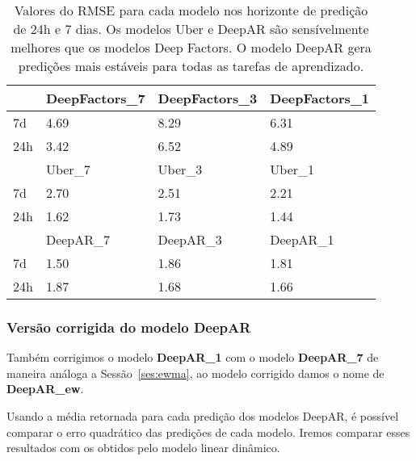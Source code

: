 \begin{center}
\begin{table}[]
  \centering
  \begin{tabular}{l|l|l|l|}
    \cline{2-4}
    & DeepFactors\_7 & DeepFactors\_3 & DeepFactors\_1 \\ \hline
    \multicolumn{1}{|l|}{7d}  & 4.69           & 8.29           & 6.31           \\ \hline
    \multicolumn{1}{|l|}{24h} & 3.42           & 6.52           & 4.89           \\ \hline
    & Uber\_7        & Uber\_3        & Uber\_1        \\ \hline
    \multicolumn{1}{|l|}{7d}  & 2.70           & 2.51           & 2.21           \\ \hline
    \multicolumn{1}{|l|}{24h} & 1.62           & 1.73           & 1.44           \\ \hline
    & DeepAR\_7      & DeepAR\_3      & DeepAR\_1      \\ \hline
    \multicolumn{1}{|l|}{7d}  & 1.50           & 1.86           & 1.81           \\ \hline
    \multicolumn{1}{|l|}{24h} & 1.87           & 1.68           & 1.66           \\ \hline
  \end{tabular}
  \caption{Valores do RMSE para cada modelo nos horizonte de predição de 24h e 7
    dias. Os modelos Uber e DeepAR são sensívelmente melhores que os modelos
    Deep Factors. O modelo DeepAR gera predições mais estáveis para todas as
    tarefas de aprendizado.}
  \label{tb:rmsetd}
\end{table}
\end{center}


\subsubsection{Versão corrigida do modelo DeepAR}

Também corrigimos o modelo \textbf{DeepAR\_1} com o modelo \textbf{DeepAR\_7} de maneira análoga a
Sessão~\ref{ses:ewma}, ao modelo corrigido damos o nome de \textbf{DeepAR\_ew}.

Usando a média retornada para cada predição dos modelos DeepAR, é possível
comparar o erro quadrático das predições de cada modelo. Iremos comparar esses resultados com os obtidos pelo modelo
linear dinâmico. 

